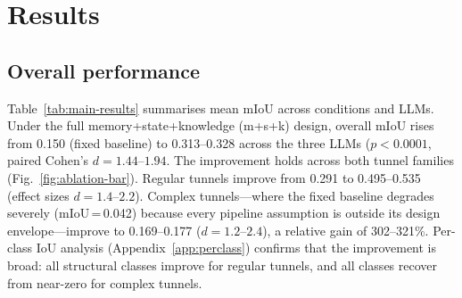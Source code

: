 \documentclass[a4paper,fleqn]{cas-dc}
\begin{document}
\section{Results}\label{sec:results}

\subsection{Overall performance}\label{sec:main-results}

Table~\ref{tab:main-results} summarises mean mIoU across conditions and LLMs. Under the full memory+state+knowledge (m+s+k) design, overall mIoU rises from 0.150 (fixed baseline) to 0.313--0.328 across the three LLMs ($p < 0.0001$, paired Cohen's $d = 1.44$--$1.94$. The improvement holds across both tunnel families (Fig.~\ref{fig:ablation-bar}). Regular tunnels improve from 0.291 to 0.495--0.535 (effect sizes $d = 1.4$--$2.2$). Complex tunnels---where the fixed baseline degrades severely (mIoU\,=\,0.042) because every pipeline assumption is outside its design envelope---improve to 0.169--0.177 ($d = 1.2$--$2.4$), a relative gain of 302--321\%. Per-class IoU analysis (Appendix~\ref{app:perclass}) confirms that the improvement is broad: all structural classes improve for regular tunnels, and all classes recover from near-zero for complex tunnels.
\end{document}
